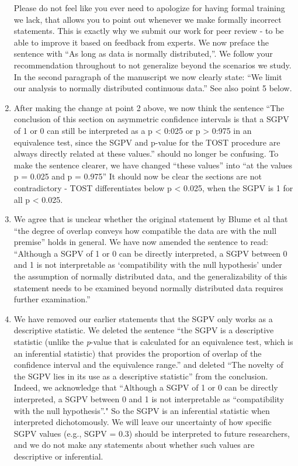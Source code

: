 \documentclass[man]{apa6}
\begin{document}
\begin{enumerate}
  Please do not feel like you ever need to apologize for having formal training we lack, that allows you to point out whenever we make formally incorrect statements. This is exactly why we submit our work for peer review - to be able to improve it based on feedback from experts. We now preface the sentence with \enquote{As long as data is normally distributed,}. We follow your recommendation throughout to not generalize beyond the scenarios we study. In the second paragraph of the manuscript we now clearly state: \enquote{We limit our analysis to normally distributed continuous data.} See also point 5 below.
\item
  After making the change at point 2 above, we now think the sentence \enquote{The conclusion of this section on asymmetric confidence intervals is that a SGPV of 1 or 0 can still be interpreted as a p \textless{} 0:025 or p \textgreater{} 0:975 in an equivalence test, since the SGPV and p-value for the TOST
  procedure are always directly related at these values.} should no longer be confusing. To make the sentence clearer, we have changed \enquote{these values} into \enquote{at the values p = 0.025 and p = 0.975} It should now be clear the sections are not contradictory - TOST differentiates below p \textless{} 0.025, when the SGPV is 1 for all p \textless{} 0.025.
\item
  We agree that is unclear whether the original statement by Blume et al that \enquote{the degree of overlap conveys how compatible the data are with the null premise} holds in general. We have now amended the sentence to read: \enquote{Although a SGPV of 1 or 0 can be directly interpreted, a SGPV between 0 and 1 is not interpretable as \enquote{compatibility with the null hypothesis} under the assumption of normally distributed data, and the generalizability of this statement needs to be examined beyond normally distributed data requires further examination.}
\item
  We have removed our earlier statements that the SGPV only works as a descriptive statistic. We deleted the sentence \enquote{the SGPV is a descriptive statistic (unlike the \emph{p}-value that is calculated for an equivalence test, which is an inferential statistic) that provides the proportion of overlap of the confidence interval and the equivalence range.} and deleted \enquote{The novelty of the SGPV lies in its use as a descriptive statistic} from the conclusion. Indeed, we acknowledge that \enquote{Although a SGPV of 1 or 0 can be directly interpreted, a SGPV between 0 and 1 is not interpretable as ``compatibility with the null hypothesis}." So the SGPV is an inferential statistic when interpreted dichotomously. We will leave our uncertainty of how specific SGPV values (e.g., SGPV = 0.3) should be interpreted to future researchers, and we do not make any statements about whether such values are descriptive or inferential.

\end{enumerate}
\end{document}

